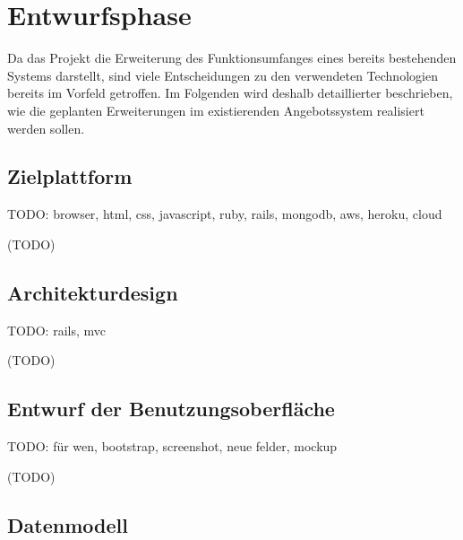\section{Entwurfsphase} 
\label{sec:Entwurfsphase}
Da das Projekt die Erweiterung des Funktionsumfanges eines bereits bestehenden Systems darstellt, sind viele Entscheidungen zu den verwendeten Technologien bereits im Vorfeld getroffen. Im Folgenden wird deshalb detaillierter beschrieben, wie die geplanten Erweiterungen im existierenden Angebotssystem realisiert werden sollen.

\subsection{Zielplattform}
\label{sec:Zielplattform}

TODO: browser, html, css, javascript, ruby, rails, mongodb, aws, heroku, cloud

(TODO)

\subsection{Architekturdesign}
\label{sec:Architekturdesign}

TODO: rails, mvc

(TODO)

\subsection{Entwurf der Benutzungsoberfläche}
\label{sec:Benutzungsoberfläche}

TODO: für wen, bootstrap, screenshot, neue felder, mockup

(TODO)

\subsection{Datenmodell}
\label{sec:Datenmodell}

